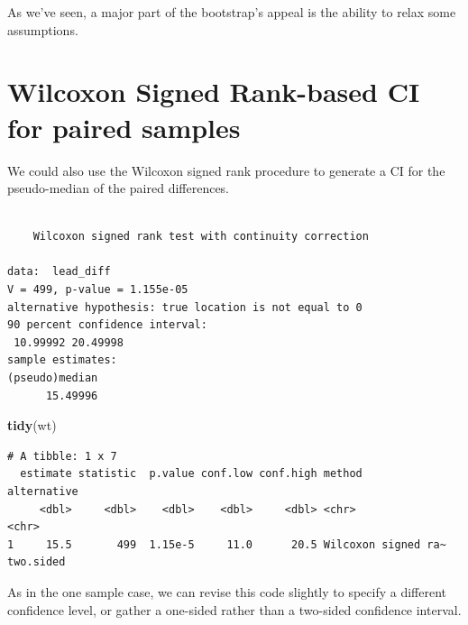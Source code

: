 \documentclass[
]{book}
\newenvironment{Shaded}{\begin{snugshade}}{\end{snugshade}}
\newcommand{\DataTypeTok}[1]{\textcolor[rgb]{0.13,0.29,0.53}{#1}}
\newcommand{\FloatTok}[1]{\textcolor[rgb]{0.00,0.00,0.81}{#1}}
\newcommand{\KeywordTok}[1]{\textcolor[rgb]{0.13,0.29,0.53}{\textbf{#1}}}
\newcommand{\NormalTok}[1]{#1}
\newcommand{\OperatorTok}[1]{\textcolor[rgb]{0.81,0.36,0.00}{\textbf{#1}}}
\newcommand{\OtherTok}[1]{\textcolor[rgb]{0.56,0.35,0.01}{#1}}
\newcommand{\StringTok}[1]{\textcolor[rgb]{0.31,0.60,0.02}{#1}}
\begin{document}
As we've seen, a major part of the bootstrap's appeal is the ability to relax some assumptions.

\hypertarget{wilcoxon-signed-rank-based-ci-for-paired-samples}{%
\section{Wilcoxon Signed Rank-based CI for paired samples}\label{wilcoxon-signed-rank-based-ci-for-paired-samples}}

We could also use the Wilcoxon signed rank procedure to generate a CI for the pseudo-median of the paired differences.

\begin{Shaded}
\end{Shaded}

\begin{verbatim}

	Wilcoxon signed rank test with continuity correction

data:  lead_diff
V = 499, p-value = 1.155e-05
alternative hypothesis: true location is not equal to 0
90 percent confidence interval:
 10.99992 20.49998
sample estimates:
(pseudo)median 
      15.49996 
\end{verbatim}

\begin{Shaded}
\begin{Highlighting}[]
\KeywordTok{tidy}\NormalTok{(wt)}
\end{Highlighting}
\end{Shaded}

\begin{verbatim}
# A tibble: 1 x 7
  estimate statistic  p.value conf.low conf.high method              alternative
     <dbl>     <dbl>    <dbl>    <dbl>     <dbl> <chr>               <chr>      
1     15.5       499  1.15e-5     11.0      20.5 Wilcoxon signed ra~ two.sided  
\end{verbatim}

As in the one sample case, we can revise this code slightly to specify a different confidence level, or gather a one-sided rather than a two-sided confidence interval.
\end{document}
